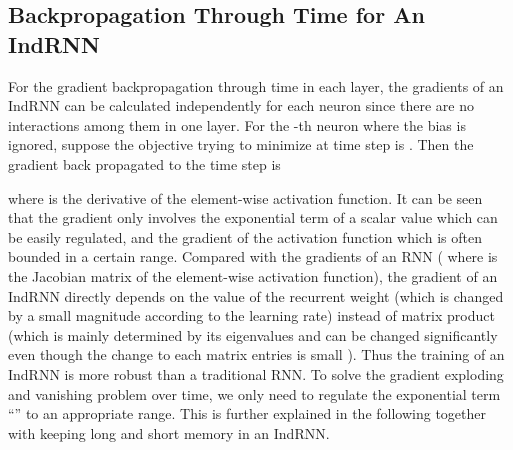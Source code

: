 \documentclass[10pt,twocolumn,letterpaper]{article}
\begin{document}
\subsection{Backpropagation Through Time for An IndRNN}
\label{BPTT}
For the gradient backpropagation through time in each layer, the gradients of an IndRNN can be calculated independently for each neuron since there are no interactions among them in one layer. For the -th neuron  where the bias is ignored, suppose the objective trying to minimize at time step  is . Then the gradient back propagated to the time step  is 
\begin{small}
{

}
\end{small}
where  is the derivative of the element-wise activation function. It can be seen that the gradient only involves the exponential term of a scalar value  which can be easily regulated, and the gradient of the activation function which is often bounded in a certain range. Compared with the gradients of an RNN ( where  is the Jacobian matrix of the element-wise activation function), the gradient of an IndRNN directly depends on the value of the recurrent weight (which is changed by a small magnitude according to the learning rate) instead of matrix product (which is mainly determined by its eigenvalues and can be changed significantly even though the change to each matrix entries is small \cite{parlett1964laguerre}). Thus the training of an IndRNN is more robust than a traditional RNN. To solve the gradient exploding and vanishing problem over time, we only need to regulate the exponential term ``'' to an appropriate range. This is further explained in the following together with keeping long and short memory in an IndRNN.
\end{document}

